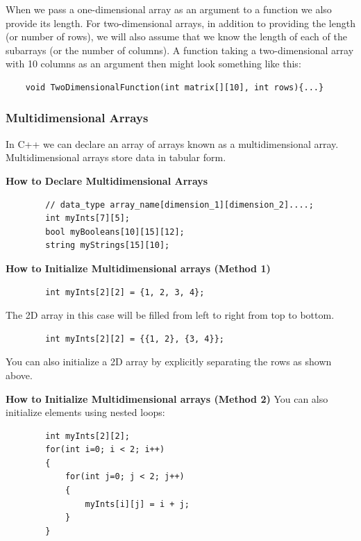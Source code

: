 When we pass a one-dimensional array as an argument to a function we also provide its length. For two-dimensional arrays, in addition to providing the length (or number of rows), we will also assume that we know the length of each of the subarrays (or the number of columns). A function taking a two-dimensional array with 10 columns as an argument then might look something like this:

\begin{verbatim}
    void TwoDimensionalFunction(int matrix[][10], int rows){...}
\end{verbatim}

\subsubsection{Multidimensional Arrays}

In C++ we can declare an array of arrays known as a multidimensional array. Multidimensional arrays store data in tabular form.

\textbf{How to Declare Multidimensional Arrays}

\begin{verbatim}
        // data_type array_name[dimension_1][dimension_2]....;
        int myInts[7][5];
        bool myBooleans[10][15][12];
        string myStrings[15][10];
\end{verbatim}

\textbf{How to Initialize Multidimensional arrays (Method 1)}

\begin{verbatim}
        int myInts[2][2] = {1, 2, 3, 4};
\end{verbatim}

The 2D array in this case will be filled from left to right from top to bottom.

\begin{verbatim}
        int myInts[2][2] = {{1, 2}, {3, 4}};
\end{verbatim}

You can also initialize a 2D array by explicitly separating the rows as shown above.

\textbf{How to Initialize Multidimensional arrays (Method 2)} You can also initialize elements using nested loops:

\begin{verbatim}
        int myInts[2][2];
        for(int i=0; i < 2; i++)
        {
            for(int j=0; j < 2; j++)
            {
                myInts[i][j] = i + j;
            }
        }
\end{verbatim}


